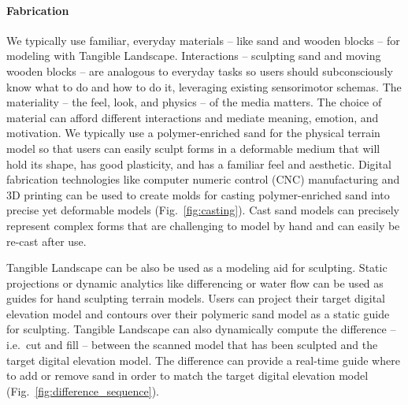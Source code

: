 \documentclass[prodmode,acmtochi]{acmsmall} %
\begin{document}
\paragraph{Fabrication}
We typically use familiar, everyday materials 
-- like sand and wooden blocks -- 
for modeling with Tangible Landscape. 
%
Interactions -- sculpting sand and moving wooden blocks -- 
are analogous to everyday tasks
so users should subconsciously know what to do and how to do it, 
leveraging existing sensorimotor schemas. 
%
The materiality -- the feel, look, and physics -- of the media matters. 
The choice of material can afford different interactions
and mediate meaning, emotion, and motivation. 
%
We typically use a polymer-enriched sand for the physical terrain model
so that users can easily sculpt forms in a deformable medium 
that will hold its shape, has good plasticity, and has a familiar feel and aesthetic. 
%
%
Digital fabrication technologies 
like computer numeric control (CNC) manufacturing and 3D printing
can be used to create molds for casting polymer-enriched sand 
into precise yet deformable models (Fig.~\ref{fig:casting}). 
%
Cast sand models can precisely represent complex forms 
that are challenging to model by hand 
and can easily be re-cast after use.

Tangible Landscape can be also be used as a modeling aid for sculpting.
%
Static projections or dynamic analytics like differencing or water flow 
can be used as guides for hand sculpting terrain models. 
%
Users can project their target digital elevation model and contours 
over their polymeric sand model as a static guide for sculpting. 
%
Tangible Landscape can also dynamically compute the difference -- i.e.\ cut and fill --
between the scanned model that has been sculpted and the target digital elevation model. 
%
The difference can provide a real-time guide 
where to add or remove sand in order to match the target digital elevation model (Fig.~\ref{fig:difference_sequence}). 
%
\end{document}
